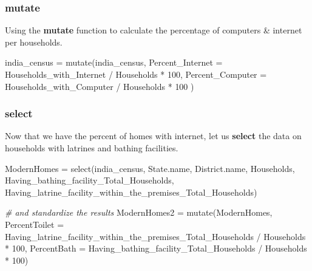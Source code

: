 \documentclass[
]{book}
\newenvironment{Shaded}{\begin{snugshade}}{\end{snugshade}}
\newcommand{\AttributeTok}[1]{\textcolor[rgb]{0.77,0.63,0.00}{#1}}
\newcommand{\CommentTok}[1]{\textcolor[rgb]{0.56,0.35,0.01}{\textit{#1}}}
\newcommand{\DecValTok}[1]{\textcolor[rgb]{0.00,0.00,0.81}{#1}}
\newcommand{\FunctionTok}[1]{\textcolor[rgb]{0.00,0.00,0.00}{#1}}
\newcommand{\NormalTok}[1]{#1}
\newcommand{\OtherTok}[1]{\textcolor[rgb]{0.56,0.35,0.01}{#1}}
\newcommand{\SpecialCharTok}[1]{\textcolor[rgb]{0.00,0.00,0.00}{#1}}
\theoremstyle{definition}
\theoremstyle{definition}
\theoremstyle{definition}
\theoremstyle{definition}
\theoremstyle{remark}
\begin{document}
\hypertarget{mutate}{%
\subsubsection{mutate}\label{mutate}}

Using the \textbf{mutate} function to calculate the percentage of computers \& internet per households.

\begin{Shaded}
\begin{Highlighting}[]
\NormalTok{india\_census }\OtherTok{=} \FunctionTok{mutate}\NormalTok{(india\_census,}
                      \AttributeTok{Percent\_Internet =}\NormalTok{ Households\_with\_Internet }\SpecialCharTok{/}\NormalTok{ Households }\SpecialCharTok{*} \DecValTok{100}\NormalTok{,}
                      \AttributeTok{Percent\_Computer =}\NormalTok{ Households\_with\_Computer }\SpecialCharTok{/}\NormalTok{ Households }\SpecialCharTok{*} \DecValTok{100}
\NormalTok{                      )}
\end{Highlighting}
\end{Shaded}

\hypertarget{select}{%
\subsubsection{select}\label{select}}

Now that we have the percent of homes with internet, let us \textbf{select} the data on households with latrines and bathing facilities.

\begin{Shaded}
\begin{Highlighting}[]
\NormalTok{ModernHomes }\OtherTok{=} \FunctionTok{select}\NormalTok{(india\_census,}
\NormalTok{                     State.name, District.name, Households, Having\_bathing\_facility\_Total\_Households,}
\NormalTok{                  Having\_latrine\_facility\_within\_the\_premises\_Total\_Households)}

\CommentTok{\# and standardize the results}
\NormalTok{ModernHomes2 }\OtherTok{=} \FunctionTok{mutate}\NormalTok{(ModernHomes, }\AttributeTok{PercentToilet =}\NormalTok{ Having\_latrine\_facility\_within\_the\_premises\_Total\_Households }\SpecialCharTok{/}\NormalTok{ Households }\SpecialCharTok{*} \DecValTok{100}\NormalTok{,}
                     \AttributeTok{PercentBath =}\NormalTok{ Having\_bathing\_facility\_Total\_Households }\SpecialCharTok{/}\NormalTok{ Households }\SpecialCharTok{*} \DecValTok{100}\NormalTok{)}
\end{Highlighting}
\end{Shaded}
\end{document}

